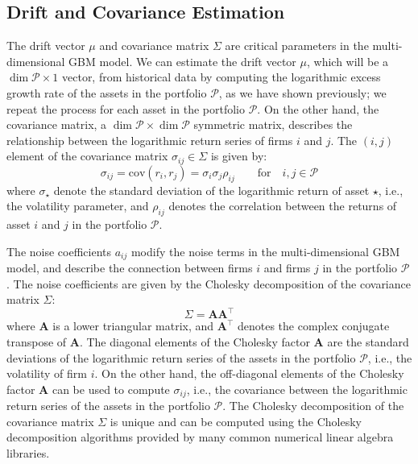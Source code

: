 \documentclass[11pt]{article}
\theoremstyle{definition}
\begin{document}
\subsection{Drift and Covariance Estimation}
The drift vector $\mu$ and covariance matrix $\Sigma$ are critical parameters in the multi-dimensional GBM model.
We can estimate the drift vector $\mu$, which will be a $\dim\mathcal{P}\times{1}$ vector, from historical data by computing the logarithmic excess growth rate of the assets in the portfolio $\mathcal{P}$, 
as we have shown previously; we repeat the process for each asset in the portfolio $\mathcal{P}$.
On the other hand, the covariance matrix, a $\dim\mathcal{P}\times\dim\mathcal{P}$ symmetric matrix, describes the relationship between the logarithmic return series of firms $i$ and $j$.
The $(i,j)$ element of the covariance matrix $\sigma_{ij}\in\Sigma$ is given by:
\begin{equation*}
    \sigma_{ij} = \text{cov}\left(r_{i},r_{j}\right) = \sigma_{i}\sigma_{j}\rho_{ij}\qquad\text{for}\quad{i,j \in \mathcal{P}}
\end{equation*}
where $\sigma_{\star}$ denote the standard deviation of the logarithmic return of asset $\star$, i.e., the volatility parameter, and $\rho_{ij}$ 
denotes the correlation between the returns of asset $i$ and $j$ in the portfolio $\mathcal{P}$. 

The noise coefficients $a_{ij}$ modify the noise terms in the multi-dimensional GBM model, 
and describe the connection between firms $i$ and firms $j$ in the portfolio $\mathcal{P}$. 
The noise coefficients are given by the Cholesky decomposition of the covariance matrix $\Sigma$:
\begin{equation*}
\Sigma = \mathbf{A}\mathbf{A}^{\top}
\end{equation*}
where $\mathbf{A}$ is a lower triangular matrix, and $\mathbf{A}^{\top}$ denotes the complex conjugate transpose of $\mathbf{A}$. The diagonal elements of the Cholesky factor $\mathbf{A}$ are the standard deviations of the logarithmic return series of the assets in the portfolio $\mathcal{P}$, i.e., the volatility of firm $i$. On the other hand, the off-diagonal elements of the Cholesky factor $\mathbf{A}$ can be used to compute $\sigma_{ij}$, i.e., the covariance between the logarithmic return series of the assets in the portfolio $\mathcal{P}$. The Cholesky decomposition of the covariance matrix $\Sigma$ is unique and can be computed using the Cholesky decomposition algorithms provided by many common numerical linear algebra libraries.
\end{document}
